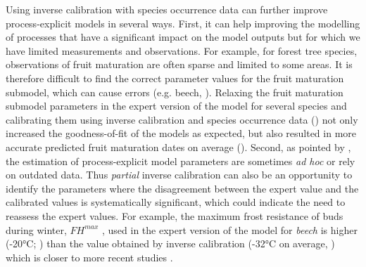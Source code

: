 \documentclass[letterpaper,8pt]{extarticle}  %
\begin{document}
\begin{doublespacing}
\begin{linenumbers}
Using inverse calibration with species occurrence data can further improve process-explicit models in several ways. First, it can help improving the modelling of processes that have a significant impact on the model outputs but for which we have limited measurements and observations. For example, for forest tree species, observations of fruit maturation are often sparse and limited to some areas. It is therefore difficult to find the correct parameter values for the fruit maturation submodel, which can cause errors (e.g. beech, ). Relaxing the fruit maturation submodel parameters in the expert version of the model for several species and calibrating them using inverse calibration and species occurrence data () not only increased the goodness-of-fit of the models as expected, but also resulted in more accurate predicted fruit maturation dates on average ().
Second, as pointed by \cite{Harrison2021}, the estimation of process-explicit model parameters are sometimes \emph{ad hoc} or rely on outdated data. Thus \emph{partial} inverse calibration can also be an opportunity to identify the parameters where the disagreement between the expert value and the calibrated values is systematically significant, which could indicate the need to reassess the expert values. For example, the maximum frost resistance of buds during winter, ${FH}^{max}$ , used in the expert version of the model for \emph{beech} is higher (-20°C; \citealt{Till1956, Lenz2013})  than the value obtained by inverse calibration (-32°C on average, ) which is closer to more recent studies \citep{Delaporte2015, Hofmann2015, Kreyling2014, Lenz2016}. 
 

\end{linenumbers}
\end{doublespacing}
\end{document}
